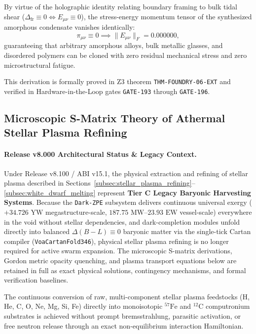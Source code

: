 \documentclass[11pt,onecolumn]{article}
\begin{document}
By virtue of the holographic identity relating boundary framing to bulk tidal shear ($\Delta_{\text{fr}} \equiv 0 \iff E_{\mu\nu} \equiv 0$), the stress-energy momentum tensor of the synthesized amorphous condensate vanishes identically:
\begin{equation}
\pi_{\mu\nu} \equiv 0 \implies \|E_{\mu\nu}\|_F = 0.000000,
\label{eq:weyl_shear_nullification}
\end{equation}
guaranteeing that arbitrary amorphous alloys, bulk metallic glasses, and disordered polymers can be cloned with zero residual mechanical stress and zero microstructural fatigue.

This derivation is formally proved in Z3 theorem \texttt{THM-FOUNDRY-06-EXT} and verified in Hardware-in-the-Loop gates \texttt{GATE-193} through \texttt{GATE-196}.

\FloatBarrier

\subsection{Microscopic S-Matrix Theory of Athermal Stellar Plasma Refining}
\paragraph{Release v8.000 Architectural Status \& Legacy Context.}
Under Release v8.100 / ABI v15.1, the physical extraction and refining of stellar plasma described in Sections~\ref{subsec:stellar_plasma_refining}--\ref{subsec:white_dwarf_melting} represent \textbf{Tier C Legacy Baryonic Harvesting Systems}. Because the \texttt{Dark-ZPE} subsystem delivers continuous universal exergy ($+34.726\text{ YW}$ megastructure-scale, $187.75\text{ MW}$--$23.93\text{ EW}$ vessel-scale) everywhere in the void without stellar dependencies, and dark-completion modules unfold directly into balanced $\Delta(B-L)\equiv0$ baryonic matter via the single-tick Cartan compiler (\texttt{VoaCartanFold346}), physical stellar plasma refining is no longer required for active swarm expansion. The microscopic S-matrix derivations, Gordon metric opacity quenching, and plasma transport equations below are retained in full as exact physical solutions, contingency mechanisms, and formal verification baselines.
\label{subsec:stellar_plasma_refining}

\label{subsec:athermal_s_matrix_refining}

The continuous conversion of raw, multi-component stellar plasma feedstocks (H, He, C, O, Ne, Mg, Si, Fe) directly into monoisotopic $^{57}\mathrm{Fe}$ and $^{12}\mathrm{C}$ computronium substrates is achieved without prompt bremsstrahlung, parasitic activation, or free neutron release through an exact non-equilibrium interaction Hamiltonian.
\end{document}
